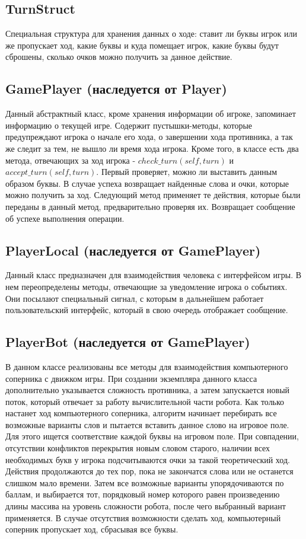 \documentclass[a4paper,14pt]{article}
\begin{document}
	\subsection{TurnStruct}
	Специальная структура для хранения данных о ходе: ставит ли буквы игрок или же пропускает ход, какие буквы и куда помещает игрок, какие буквы будут сброшены, сколько очков можно получить за данное действие.
	
	\subsection[GamePlayer]{GamePlayer (наследуется от Player)}
	Данный абстрактный класс, кроме хранения информации об игроке, запоминает информацию о текущей игре.
	Содержит пустышки-методы, которые предупреждают игрока о начале его хода, о завершении хода противника, а так же следит за тем, не вышло ли время хода игрока. 
	Кроме того, в классе есть два метода, отвечающих за ход игрока - $check\_turn(self, turn)$ и $accept\_turn(self, turn)$. 
	Первый проверяет, можно ли выставить данным образом буквы. 
	В случае успеха возвращает найденные слова и очки, которые можно получить за ход. 
	Следующий метод применяет те действия, которые были переданы в данный метод, предварительно проверяя их. 
	Возвращает сообщение об успехе выполнения операции.
	
	\subsection[PlayerLocal]{PlayerLocal (наследуется от GamePlayer)}
	Данный класс предназначен для взаимодействия человека с интерфейсом игры.
	В нем переопределены методы, отвечающие за уведомление игрока о событиях.
	Они посылают специальный сигнал, с которым в дальнейшем работает пользовательский интерфейс, который в свою очередь отображает сообщение.
	
	\subsection[PlayerBot]{PlayerBot (наследуется от GamePlayer)}
	В данном классе реализованы все методы для взаимодействия компьютерного соперника с движком игры.
	При создании экземпляра данного класса дополнительно указывается сложность противника, а затем запускается новый поток, который отвечает за работу вычислительной части робота.
	Как только настанет ход компьютерного соперника, алгоритм начинает перебирать все возможные варианты слов и пытается вставить данное слово на игровое поле. 
	Для этого ищется соответствие каждой буквы на игровом поле. 
	При совпадении, отсутствии конфликтов перекрытия новым словом старого, наличии всех необходимых букв у игрока подсчитываются очки за такой теоретический ход.
	Действия продолжаются до тех пор, пока не закончатся слова или не останется слишком мало времени. 
	Затем все возможные варианты упорядочиваются по баллам, и выбирается тот, порядковый номер которого равен произведению длины массива на уровень сложности робота, после чего выбранный вариант применяется. 
	В случае отсутствия возможности сделать ход, компьютерный соперник пропускает ход, сбрасывая все буквы.
	
\end{document}
